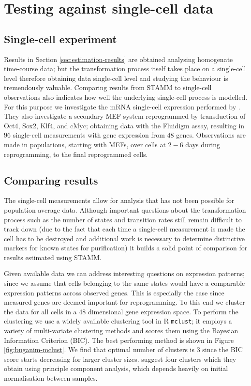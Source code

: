 \section{Testing against single-cell data}
\label{sec:test-single-cell}

\subsection{Single-cell experiment}
\label{sec:single-cell-exper}

Results in Section \ref{sec:estimation-results} are obtained analysing homogenate time-course data; but the transformation process itself takes place on a single-cell level therefore obtaining data single-cell level and studying the behaviour is tremendously valuable. Comparing results from STAMM to single-cell observations also indicates how well the underlying single-cell process is modelled. For this purpose we investigate the mRNA single-cell expression performed by \cite{Buganim:2012hp}. They also investigate a secondary MEF system reprogrammed by transduction of Oct4, Sox2, Klf4, and cMyc; obtaining data with the Fluidigm assay, resulting in $96$ single-cell measurements with gene expression from $48$ genes. Observations are made in populations, starting with MEFs, over cells at $2 - 6$ days during reprogramming, to the final reprogrammed cells.

\subsection{Comparing results}
\label{sec:comparing-results}

The single-cell measurements \citep{Buganim:2012hp} allow for analysis that has not been possible for population average data. Although important questions about the transformation process such as the number of states and transition rates still remain difficult to track down (due to the fact that each time a single-cell measurement is made the cell has to be destroyed and additional work is necessary to determine distinctive markers for known states for purification) it builds a solid point of comparison for results estimated using STAMM.

Given available data we can address interesting questions on expression patterns; since we assume that cells belonging to the same states would have a comparable expression patterns across observed genes. This is especially the case since measured genes are deemed important for reprogramming. To this end we cluster the data for all cells in a $48$ dimensional gene expression space. To perform the clustering we use a widely available clustering tool in R \texttt{mclust}; it employs a variety of multi-variate clustering methods and scores them using the Bayesian Information Criterion (BIC). The best performing method is shown in Figure \ref{fig:buganim-mclust}. We find that optimal number of clusters is $3$ since the BIC score starts decreasing for larger cluster sizes. \cite{Buganim:2012hp} suggest four clusters which they obtain using principle component analysis, which depends heavily on initial normalisation between samples.

